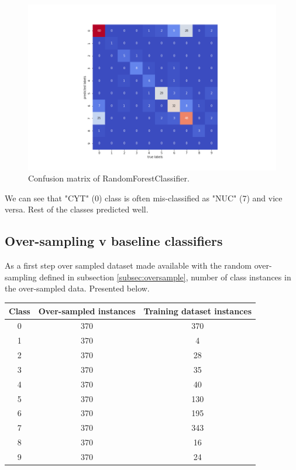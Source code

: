\documentclass[12pt]{article}
\begin{document}
\begin{figure}[H] \label{fig:rfconfusion}
    \centering
    \includegraphics[width=\textwidth]{img/rfheatmap.png}
    \caption{Confusion matrix of RandomForestClassifier.}
\end{figure}

We can see that "CYT" (0) class is often mis-classified as "NUC" (7) and vice versa. Rest of the classes predicted well.

\subsection{Over-sampling v baseline classifiers}
As a first step over sampled dataset made available with the random over-sampling defined in subsection \ref{subsec:oversample}, number of class instances in the over-sampled data. Presented below.

\begin{center}
    \begin{tabular}{||c c c||} 
    \hline
    Class & Over-sampled instances & Training dataset instances\\ [0.5ex] 
    \hline\hline
    0 & 370 & 370\\ 
    \hline
    1 & 370 & 4\\
    \hline
    2 & 370 & 28\\
    \hline
    3 & 370 & 35\\
    \hline
    4 & 370 & 40\\
    \hline
    5 & 370 & 130\\
    \hline
    6 & 370 & 195\\
    \hline
    7 & 370 & 343\\
    \hline
    8 & 370 & 16\\
    \hline
    9 & 370 & 24\\ [1ex] 
    \hline
   \end{tabular}
\end{center}
\end{document}
